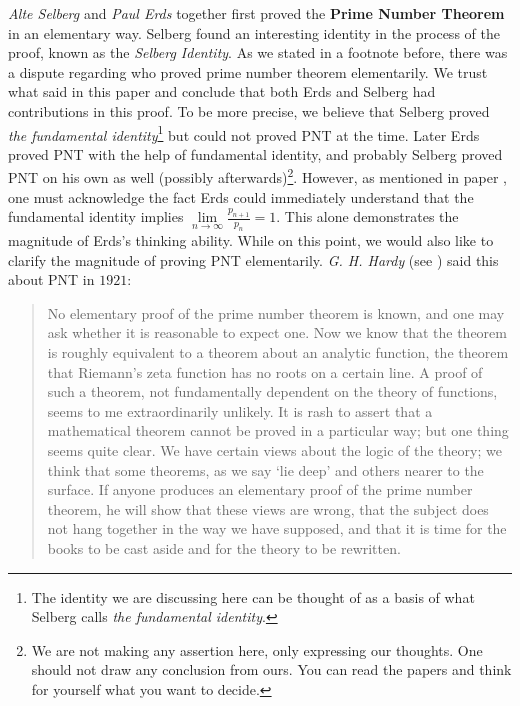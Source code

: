 \documentclass{subfile}
\begin{document}
	\textit{Alte Selberg} and \textit{Paul Erds} together first proved the \textbf{Prime Number Theorem} in an elementary way. Selberg found an interesting identity in the process of the proof, known as the \textit{Selberg Identity}. As we stated in a footnote before, there was a dispute regarding who proved prime number theorem elementarily. We trust what \textcite{goldfeld_2004} said in this paper and conclude that both Erds and Selberg had contributions in this proof. To be more precise, we believe that Selberg proved \textit{the fundamental identity}\footnote{The identity we are discussing here can be thought of as a basis of what Selberg calls \textit{the fundamental identity}.} but could not proved PNT at the time. Later Erds proved PNT with the help of fundamental identity, and probably Selberg proved PNT on his own as well (possibly afterwards)\footnote{We are not making any assertion here, only expressing our thoughts. One should not draw any conclusion from ours. You can read the papers and think for yourself what you want to decide.}. However, as mentioned in paper \textcite[Page $6$]{goldfeld_2004}, one must acknowledge the fact Erds could immediately understand that the fundamental identity implies $\lim\limits_{n\to\infty}\frac{p_{n+1}}{p_n}=1$. This alone demonstrates the magnitude of Erds's thinking ability. While on this point, we would also like to clarify the magnitude of proving PNT elementarily. \textit{G. H. Hardy} (see \textcite[Page $3$]{goldfeld_2004}) said this about PNT in $1921$:
		\begin{quote}
			No elementary proof of the prime number theorem is known, and one may ask whether it is reasonable to expect one. Now we know that the theorem is roughly equivalent to a theorem about an analytic function, the theorem that Riemann's zeta function has no roots on a certain line. A proof of such a theorem, not fundamentally dependent on the theory of functions, seems to me extraordinarily unlikely. It is rash to assert that a mathematical theorem cannot be proved in a particular way; but one thing seems quite clear. We have certain views about the logic of the theory; we think that some theorems, as we say `lie deep' and others nearer to the surface. If anyone produces an elementary proof of the prime number theorem, he will show that these views are wrong, that the subject does not hang together in the way we have supposed, and that it is time for the books to be cast aside and for the theory to be rewritten.
		\end{quote}
\end{document}
